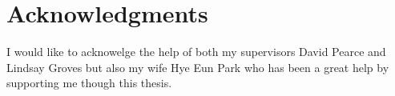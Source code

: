 
\chapter*{Acknowledgments}\label{C:ack} 

I would like to acknowelge the help of both my supervisors David Pearce and Lindsay Groves but also my wife Hye Eun Park who has been a great help by supporting me though this thesis.
